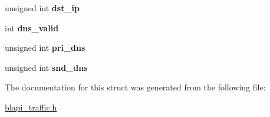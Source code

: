 \begin{DoxyCompactItemize}
unsigned int {\bfseries dst\+\_\+ip}
\item 
\mbox{\label{structECNT__TRAFFIC__PPPOE__INFO__DATA_ab555ce8d8e7718cbb6e847c90bd2a4a5}} 
int {\bfseries dns\+\_\+valid}
\item 
\mbox{\label{structECNT__TRAFFIC__PPPOE__INFO__DATA_a36545e848cf25bb953c3d70d8eaf8ca1}} 
unsigned int {\bfseries pri\+\_\+dns}
\item 
\mbox{\label{structECNT__TRAFFIC__PPPOE__INFO__DATA_a595115db05db7f47701a48522b49ab6c}} 
unsigned int {\bfseries snd\+\_\+dns}
\end{DoxyCompactItemize}


The documentation for this struct was generated from the following file\+:\begin{DoxyCompactItemize}
\item 
\hyperlink{blapi__traffic_8h}{blapi\+\_\+traffic.\+h}\end{DoxyCompactItemize}
